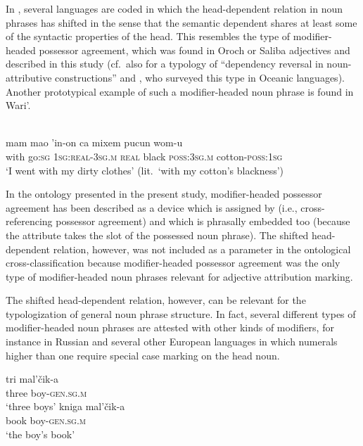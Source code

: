 In , several languages are coded in which the head-dependent relation in noun phrases has shifted in the sense that the semantic dependent shares at least some of the syntactic properties of the head. This resembles the type of modifier\hyp{}headed possessor agreement, which was found in Oroch or Saliba adjectives and described in this study (cf.~also \citealt{malchukov2000} for a typology of “dependency reversal in noun-attributive constructions” and \citealt{ross1998}, who surveyed this type in Oceanic languages). Another prototypical example of such a modifier\hyp{}headed noun phrase is found in Wari'.
\begin{exe}
\ex
\label{ex1}
\\
  \gll	mam mao 'in-on		ca	    mixem  pucun	wom-u\\
  	with  go:\textsc{sg}  \textsc{1sg:real-3sg.m}	\textsc{real}  black    \textsc{poss:3sg.m}	cotton-\textsc{poss:1sg}\\
  \glt ‘I went with my dirty clothes’ (lit.~‘with my cotton's blackness’)
\end{exe}

In the ontology presented in the present study, modifier\hyp{}headed possessor agreement has been described as a device which is assigned by  (i.e., cross-referencing possessor agreement) and which is phrasally embedded too (because the attribute takes the slot of the possessed noun phrase). The shifted head-dependent relation, however, was not included as a parameter in the ontological cross-classification because modifier\hyp{}headed possessor agreement was the only type of modifier\hyp{}headed noun phrases relevant for adjective attribution marking.

The shifted head-dependent relation, however, can be relevant for the typologization of general noun phrase structure. In fact, several different types of modifier\hyp{}headed noun phrases are attested with other kinds of modifiers, for instance in Russian and several other European languages in which numerals higher than one require special case marking on the head noun.
\begin{exe}
\ex
\label{russianheadstand}
\begin{xlist}
\ex
\label{rushead}
\gll tri mal'čik-a\\
  	three		boy-\textsc{gen.sg.m}\\
  \glt ‘three boys’
\ex
\label{rusgen}
  \gll	kniga mal'čik-a\\
  	book	 boy-\textsc{gen.sg.m}\\
  \trans ‘the boy's book’
\end{xlist}
\end{exe}

